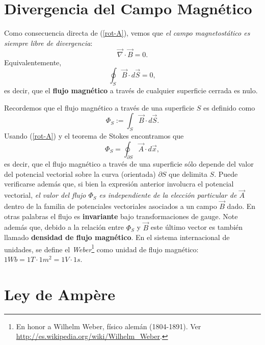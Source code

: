 \section{Divergencia del Campo Magnético}

Como consecuencia directa de (\ref{rot-A}), vemos que \textit{el campo magnetostático
es siempre libre de divergencia}:
\begin{equation}
 \boxed{\vec{\nabla}\cdot\vec{B}=0.} \label{divB}
\end{equation}
Equivalentemente,
\begin{equation}
 \oint_S\vec{B}\cdot d\vec{S}=0,
\end{equation}
es decir, que el \textbf{flujo magnético} a través de cualquier superficie cerrada es nulo.

Recordemos que el flujo magnético a través de una superficie $S$ es definido
como
\begin{equation}
 \Phi_S:= \int_S\vec{B}\cdot d\vec{S}.
\end{equation}
Usando (\ref{rot-A}) y el teorema de Stokes encontramos que
\begin{equation}\label{PAdx}
 \Phi_S=\oint_{\partial S}\vec{A}\cdot d\vec{x},
\end{equation}
es decir, que el flujo magnético a través de una superficie sólo depende del
valor del potencial vectorial sobre la curva (orientada) $\partial S$ que delimita $S$.
Puede verificarse además que, si bien la expresión anterior involucra el
potencial vectorial, \textit{el valor del flujo $\Phi_S$ es independiente de la
elección particular de $\vec{A}$} dentro de la familia de potenciales
vectoriales asociados a un campo $\vec B$ dado. En otras palabras el flujo es
\textbf{invariante} bajo transformaciones de gauge. Note además que, debido a la
relación entre $\Phi_S$ y $\vec{B}$ este último vector es también llamado
\textbf{densidad de flujo magnético}. En el sistema internacional de unidades, se define el \textit{Weber}\footnote{En honor a Wilhelm Weber, físico alemán (1804-1891). Ver \url{http://es.wikipedia.org/wiki/Wilhelm_Weber}.} como unidad de flujo magnético: $1Wb=1T\cdot 1m^2=1V\cdot 1s$.

\section{Ley de Amp\`ere}

